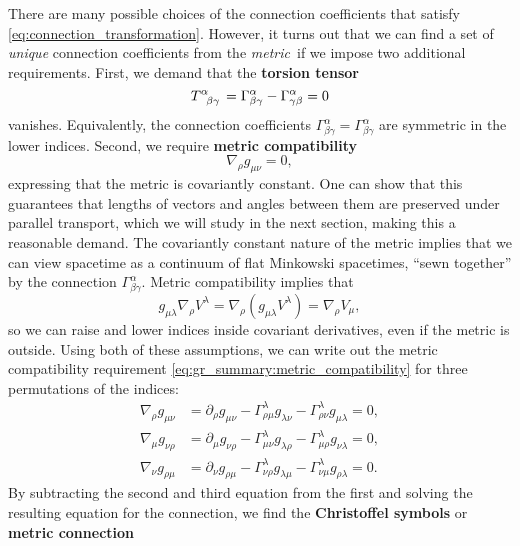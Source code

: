 There are many possible choices of the connection coefficients that satisfy \cref{eq:connection_transformation}.
However, it turns out that we can find a set of \emph{unique} connection coefficients from the \emph{metric} if we impose two additional requirements.
First, we demand that the \textbf{torsion tensor}
\begin{equation}
	T\indices{^\alpha_\beta_\gamma} = \Gamma^\alpha_{\beta\gamma} - \Gamma^\alpha_{\gamma\beta} = 0
	\label{eq:torsion_tensor}
\end{equation}
vanishes.
Equivalently, the connection coefficients $ \Gamma^\alpha_{\beta\gamma} = \Gamma^\alpha_{\beta\gamma} $ are symmetric in the lower indices.
Second, we require \textbf{metric compatibility}
\begin{equation}
	\nabla_\rho g_{\mu \nu} = 0 ,
\label{eq:gr_summary:metric_compatibility}
\end{equation}
expressing that the metric is covariantly constant.
One can show that this guarantees that lengths of vectors and angles between them are preserved under parallel transport, which we will study in the next section, making this a reasonable demand. \cite[equation 2.10]{ref:hehl}
The covariantly constant nature of the metric implies that we can view spacetime as a continuum of flat Minkowski spacetimes, ``sewn together'' by the connection $\Gamma^\alpha_{\beta \gamma}$.
Metric compatibility implies that
\begin{equation}
	g_{\mu \lambda} \nabla_\rho V^\lambda = \nabla_\rho (g_{\mu \lambda} V^\lambda) = \nabla_\rho V_\mu ,
\end{equation}
so we can raise and lower indices inside covariant derivatives, even if the metric is outside.
Using both of these assumptions, we can write out the metric compatibility requirement \eqref{eq:gr_summary:metric_compatibility} for three permutations of the indices:
\newcommand\metriccompatibilityequation[3]{\nabla_{#1} g_{{#2}{#3}} &= \partial_{#1} g_{{#2}{#3}} - \Gamma^\lambda_{{#1}{#2}} g_{\lambda {#3}} - \Gamma^\lambda_{{#1}{#3}} g_{{#2} \lambda} = 0}
\begin{subequations}
\begin{align}
	\metriccompatibilityequation{\rho}{\mu}{\nu} , \\
	\metriccompatibilityequation{\mu}{\nu}{\rho} , \\
	\metriccompatibilityequation{\nu}{\rho}{\mu} .
\end{align}
\end{subequations}
By subtracting the second and third equation from the first and solving the resulting equation for the connection, we find the \textbf{Christoffel symbols} or \textbf{metric connection}
